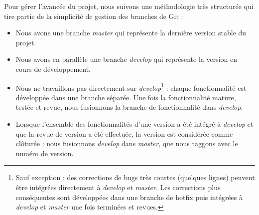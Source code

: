 Pour gérer l'avancée du projet, nous suivons une méthodologie très structurée qui tire partie de la simplicité de gestion des branches de Git :
\begin{itemize}
\renewcommand{\labelitemi}{$\bullet$}
\item Nous avons une branche \textit{master} qui représente la dernière version stable du projet.
\item Nous avons en parallèle une branche \textit{develop} qui représente la version en cours de développement.
\item Nous ne travaillons pas directement sur \textit{develop}\footnote{Sauf exception : des corrections de bugs très courtes (quelques lignes) peuvent être intégrées directement à \textit{develop} et \textit{master}. Les corrections plus conséquentes sont développées dans une branche de hotfix puis intégrées à \textit{develop} et \textit{master} une fois terminées et revues.} : chaque fonctionnalité est développée dans une branche séparée. Une fois la fonctionnalité mature, testée et revue, nous fusionnons la branche de fonctionnalité dans \textit{develop}.
\item Lorsque l'ensemble des fonctionnalités d'une version a été intégré à \textit{develop} et que la revue de version a été effectuée, la version est considérée comme clôturée : nous fusionnons \textit{develop} dans \textit{master}, que nous taggons avec le numéro de version.
\end{itemize}
